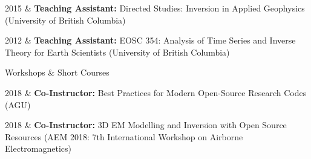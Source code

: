 \documentclass[a4paper, 11pt]{article}
\newcommand{\subheading}[1]{
    \vspace{-0.1cm}
    {\large #1}\\
    \vspace{-0.3cm}
}
\begin{document}
\begin{entryright}
2015 & \textbf{Teaching Assistant:} Directed Studies: Inversion in Applied Geophysics
(University of British Columbia) \\
\end{entryright}


\begin{entryright}
2012 & \textbf{Teaching Assistant:} EOSC 354: Analysis of Time Series and Inverse Theory for Earth Scientists
(University of British Columbia) \\
\end{entryright}

\subheading{Workshops \& Short Courses}


\begin{entryright}
    2018 & \textbf{Co-Instructor:} Best Practices for Modern Open-Source Research Codes (AGU) \\
\end{entryright}

\begin{entryright}
    2018 & \textbf{Co-Instructor:} 3D EM Modelling and Inversion with Open Source Resources (AEM 2018: 7th International Workshop on Airborne Electromagnetics)\\
\end{entryright}
\end{document}
